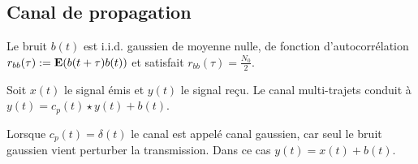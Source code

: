 \subsection{Canal de propagation}

	\begin{hyp}
		Le bruit $b(t)$ est i.i.d. gaussien de moyenne nulle, de fonction d'autocorrélation $r_{bb}(\tau) := \mathbf{E}(b(t + \tau) b(t))$ et satisfait $r_{bb}(\tau) = \frac{N_0}{2}$.
	\end{hyp}
	
	\begin{pop}
		Soit $x(t)$ le signal émis et $y(t)$ le signal reçu.
		Le canal multi-trajets conduit à $y(t) = c_p(t) \star y(t) + b(t)$.
	\end{pop}
	
	Lorsque $c_p(t) = \delta(t)$ le canal est appelé canal gaussien, car seul le bruit gaussien vient perturber la transmission.
	Dans ce cas $y(t) = x(t) + b(t)$.